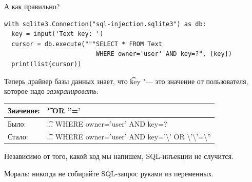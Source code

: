 \begin{frame}[fragile]{А как правильно?}
\begin{verbatim}
with sqlite3.Connection("sql-injection.sqlite3") as db:
  key = input('Text key: ')
  cursor = db.execute("""SELECT * FROM Text
                         WHERE owner='user' AND key=?", [key])
  print(list(cursor))
\end{verbatim}
	Теперь драйвер базы данных знает, что \t{key} "--- это значение от пользователя,
	которое надо \textit{заэкранировать}:
	\begin{center}
		\begin{tabular}{ll}
			Значение: & \t{' OR ''='} \\\hline
			Было:  & \t{... WHERE owner='user' AND key=?} \\\hline
			Стало: & \t{... WHERE owner='user' AND key='\textbackslash' OR  \textbackslash'\textbackslash'=\textbackslash''} \\
		\end{tabular}
	\end{center}
	Независимо от того, какой код мы напишем, SQL-инъекции не случится.

	Мораль: никогда не собирайте SQL-запрос руками из переменных.
\end{frame}
